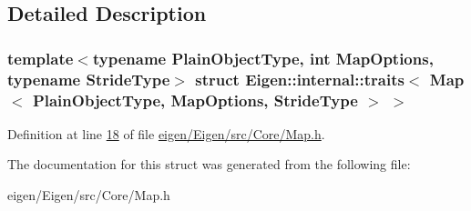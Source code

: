 \subsection{Detailed Description}
\subsubsection*{template$<$typename Plain\+Object\+Type, int Map\+Options, typename Stride\+Type$>$\newline
struct Eigen\+::internal\+::traits$<$ Map$<$ Plain\+Object\+Type, Map\+Options, Stride\+Type $>$ $>$}



Definition at line \hyperlink{eigen_2_eigen_2src_2_core_2_map_8h_source_l00018}{18} of file \hyperlink{eigen_2_eigen_2src_2_core_2_map_8h_source}{eigen/\+Eigen/src/\+Core/\+Map.\+h}.



The documentation for this struct was generated from the following file\+:\begin{DoxyCompactItemize}
\item 
eigen/\+Eigen/src/\+Core/\+Map.\+h\end{DoxyCompactItemize}
